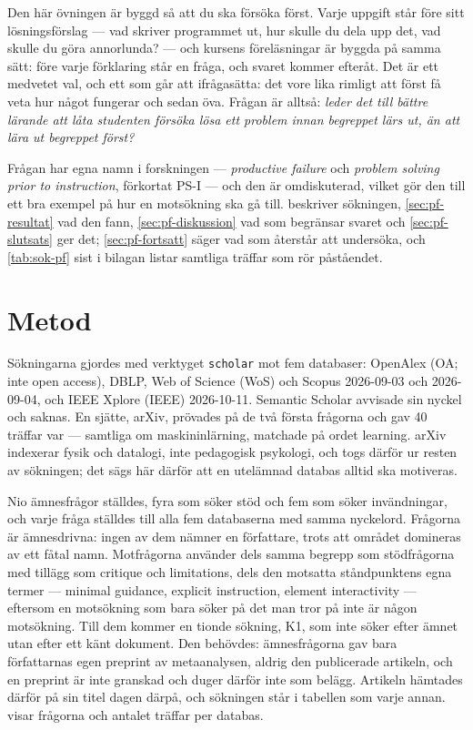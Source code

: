 Den här övningen är byggd så att du ska försöka först.  Varje uppgift
står före sitt lösningsförslag --- vad skriver programmet ut, hur skulle du
dela upp det, vad skulle du göra annorlunda? --- och kursens föreläsningar
är byggda på samma sätt: före varje förklaring står en fråga, och svaret
kommer efteråt.  Det är ett medvetet val, och ett som går att
ifrågasätta: det vore lika rimligt att först få veta hur något fungerar och sedan öva.  Frågan är alltså:
\emph{leder det till bättre lärande att låta studenten försöka lösa ett
problem innan begreppet lärs ut, än att lära ut begreppet först?}

Frågan har egna namn i forskningen ---
\emph{\foreignlanguage{english}{productive failure}} och
\emph{\foreignlanguage{english}{problem solving prior to instruction}},
förkortat PS-I --- och den är omdiskuterad, vilket gör den till ett bra
exempel på hur en motsökning ska gå till.   beskriver
sökningen, \cref{sec:pf-resultat} vad den fann, \cref{sec:pf-diskussion}
vad som begränsar svaret och \cref{sec:pf-slutsats} ger det;
\cref{sec:pf-fortsatt} säger vad som återstår att undersöka, och
\cref{tab:sok-pf} sist i bilagan listar samtliga träffar som rör
påståendet.

\section{Metod}
\label{sec:pf-metod}

Sökningarna gjordes med verktyget \texttt{scholar} mot fem databaser:
OpenAlex (OA; inte \foreignlanguage{english}{open access}), DBLP, Web of
Science (WoS) och Scopus 2026-09-03 och 2026-09-04, och IEEE Xplore
(IEEE) 2026-10-11.  Semantic Scholar avvisade sin nyckel och saknas.  En
sjätte, arXiv, prövades på de två första frågorna och gav 40
träffar var --- samtliga om maskininlärning, matchade på ordet
\foreignlanguage{english}{learning}.  arXiv indexerar fysik och datalogi,
inte pedagogisk psykologi, och togs därför ur resten av sökningen; det sägs
här därför att en utelämnad databas alltid ska motiveras.

Nio ämnesfrågor ställdes, fyra som söker stöd och fem som söker
invändningar, och varje fråga ställdes till alla fem databaserna med samma
nyckelord.
Frågorna är ämnesdrivna: ingen av dem nämner en författare, trots att
området domineras av ett fåtal namn.  Motfrågorna använder dels samma
begrepp som stödfrågorna med tillägg som
\foreignlanguage{english}{critique} och
\foreignlanguage{english}{limitations}, dels den motsatta ståndpunktens egna
termer --- \foreignlanguage{english}{minimal guidance},
\foreignlanguage{english}{explicit instruction},
\foreignlanguage{english}{element interactivity} --- eftersom en motsökning
som bara söker på det man tror på inte är någon motsökning.
Till dem kommer en tionde sökning, K1, som inte söker efter ämnet utan
efter ett känt dokument.  Den behövdes: ämnesfrågorna gav bara författarnas
egen preprint av metaanalysen, aldrig den publicerade artikeln, och en
preprint är inte granskad och duger därför inte som belägg.
Artikeln hämtades
därför på sin titel dagen därpå, och sökningen står i tabellen som
varje annan.
 visar frågorna och antalet träffar per databas.

